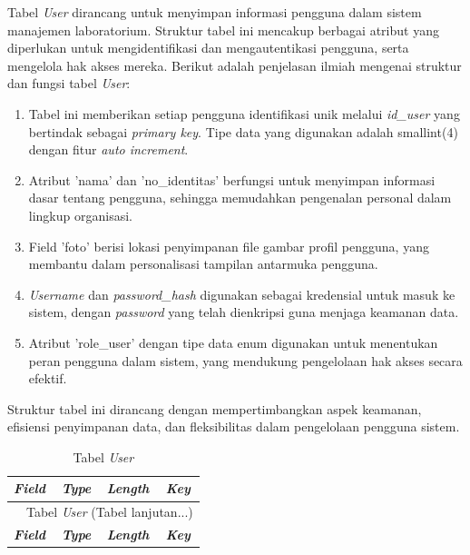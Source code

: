 \begin{enumerate}
	      Tabel \textit{User} dirancang untuk menyimpan informasi pengguna dalam sistem manajemen laboratorium. Struktur tabel ini mencakup berbagai atribut yang diperlukan untuk mengidentifikasi dan mengautentikasi pengguna, serta mengelola hak akses mereka. Berikut adalah penjelasan ilmiah mengenai struktur dan fungsi tabel \textit{User}:

	      \begin{enumerate}[label=\alph*.]
		      \item Tabel ini memberikan setiap pengguna identifikasi unik melalui \textit{id\_user} yang bertindak sebagai \textit{primary key}. Tipe data yang digunakan adalah smallint(4) dengan fitur \textit{auto increment}.
		      \item Atribut 'nama' dan 'no\_identitas' berfungsi untuk menyimpan informasi dasar tentang pengguna, sehingga memudahkan pengenalan personal dalam lingkup organisasi.
		      \item Field 'foto' berisi lokasi penyimpanan file gambar profil pengguna, yang membantu dalam personalisasi tampilan antarmuka pengguna.
		      \item \textit{Username} dan \textit{password\_hash} digunakan sebagai kredensial untuk masuk ke sistem, dengan \textit{password} yang telah dienkripsi guna menjaga keamanan data.
		      \item Atribut 'role\_user' dengan tipe data enum digunakan untuk menentukan peran pengguna dalam sistem, yang mendukung pengelolaan hak akses secara efektif.
	      \end{enumerate}

	      Struktur tabel ini dirancang dengan mempertimbangkan aspek keamanan, efisiensi penyimpanan data, dan fleksibilitas dalam pengelolaan pengguna sistem.

		      {
			      \fontsize{10}{12}\selectfont
			      \begin{longtable}{l l l l}
				      \caption{Tabel \textit{User}}
				      \label{admin}                                                                                                                 \\
				      \hline
				      \textbf{\textit{Field}} & \textbf{\textit{Type}} & \textbf{\textit{Length}}                           & \textbf{\textit{Key}} \\
				      \hline
				      \endfirsthead

				      \multicolumn{4}{c}{\tablename\ \thetable\ {Tabel \textit{User}} \space (Tabel lanjutan...)}                                   \\
				      \hline
				      \textbf{\textit{Field}} & \textbf{\textit{Type}} & \textbf{\textit{Length}}                           & \textbf{\textit{Key}} \\
				      \hline
				      \endhead


\end{longtable}}
\end{enumerate}
